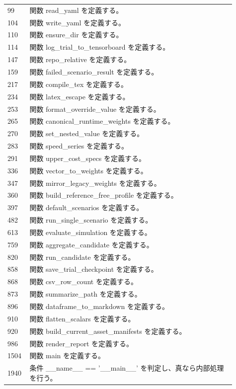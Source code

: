 \documentclass[a4paper,11pt]{article}
\begin{document}
\begin{longtable}{p{0.07\linewidth} p{0.84\linewidth}}
99 & 関数 read\_yaml を定義する。 \\
104 & 関数 write\_yaml を定義する。 \\
110 & 関数 ensure\_dir を定義する。 \\
114 & 関数 log\_trial\_to\_tensorboard を定義する。 \\
147 & 関数 repo\_relative を定義する。 \\
159 & 関数 failed\_scenario\_result を定義する。 \\
217 & 関数 compile\_tex を定義する。 \\
234 & 関数 latex\_escape を定義する。 \\
253 & 関数 format\_override\_value を定義する。 \\
265 & 関数 canonical\_runtime\_weights を定義する。 \\
270 & 関数 set\_nested\_value を定義する。 \\
283 & 関数 speed\_series を定義する。 \\
291 & 関数 upper\_cost\_specs を定義する。 \\
336 & 関数 vector\_to\_weights を定義する。 \\
347 & 関数 mirror\_legacy\_weights を定義する。 \\
360 & 関数 build\_reference\_free\_profile を定義する。 \\
397 & 関数 default\_scenarios を定義する。 \\
482 & 関数 run\_single\_scenario を定義する。 \\
613 & 関数 evaluate\_simulation を定義する。 \\
759 & 関数 aggregate\_candidate を定義する。 \\
820 & 関数 run\_candidate を定義する。 \\
858 & 関数 save\_trial\_checkpoint を定義する。 \\
868 & 関数 csv\_row\_count を定義する。 \\
873 & 関数 summarize\_path を定義する。 \\
896 & 関数 dataframe\_to\_markdown を定義する。 \\
910 & 関数 flatten\_scalars を定義する。 \\
920 & 関数 build\_current\_asset\_manifests を定義する。 \\
986 & 関数 render\_report を定義する。 \\
1504 & 関数 main を定義する。 \\
1940 & 条件 \_\_name\_\_ == '\_\_main\_\_' を判定し、真なら内部処理を行う。 \\
            \bottomrule
            \end{longtable}
\end{document}
